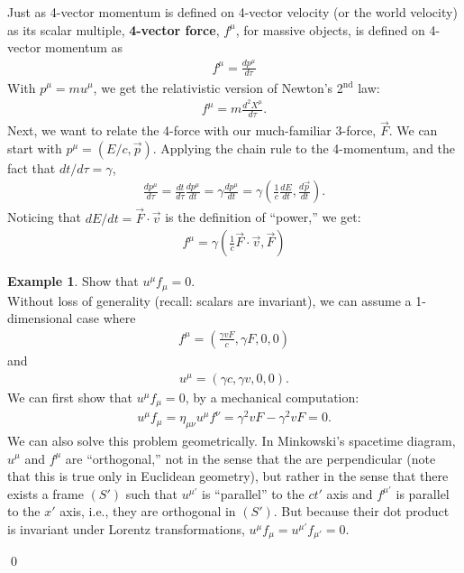 \documentclass{book}
\theoremstyle{definition}
\newtheorem{exmp}{Example}[section]
\begin{document}
Just as 4-vector momentum is defined on 4-vector velocity (or the world velocity) as its scalar multiple, \textbf{4-vector force}, $f^\mu$, for massive objects, is defined on 4-vector momentum as
\begin{align*}
\boxed{f^\mu = \frac{dp^\mu}{d\tau}}
\end{align*}
With $p^\mu = mu^\mu$, we get the relativistic version of Newton's 2$^\text{nd}$ law:
\begin{align*}
f^\mu = m\frac{d^2X^\mu}{d\tau}.
\end{align*}
Next, we want to relate the 4-force with our much-familiar 3-force, $\vec{F}$. We can start with $p^\mu = (E/c, \vec{p})$. Applying the chain rule to the 4-momentum, and the fact that $dt/d\tau = \gamma$,
\begin{align*}
\frac{dp^\mu}{d\tau} = \frac{dt}{d\tau}\frac{dp^\mu}{dt} = \gamma\frac{dp^\mu}{dt} = \gamma\left( \frac{1}{c}\frac{dE}{dt},\frac{d\vec{p}}{dt} \right).
\end{align*}
Noticing that $dE/dt = \vec{F}\cdot\vec{v}$ is the definition of ``power,'' we get:
\begin{align*}
\boxed{f^\mu = \gamma\left( \frac{1}{c}\vec{F}\cdot\vec{v}, \vec{F} \right)} 
\end{align*}
\begin{exmp}
	Show that $u^\mu f_\mu = 0$.\\
	
	Without loss of generality (recall: scalars are invariant), we can assume a 1-dimensional case where
	\begin{align*}
	f^\mu = \left( \frac{\gamma v F}{c}, \gamma F, 0,0\right) 
	\end{align*}
	and
	\begin{align*}
	u^\mu = \left( \gamma c, \gamma v,0,0 \right). 
	\end{align*}
	We can first show that $u^\mu f_\mu = 0$, by a mechanical computation:
	\begin{align*}
	u^\mu f_\mu = \eta_{\mu\nu}u^\mu f^\nu = \gamma^2vF - \gamma^2 vF = 0.
	\end{align*}
	We can also solve this problem geometrically. In Minkowski's spacetime diagram, $u^\mu$ and $f^\mu$ are ``orthogonal,'' not in the sense that the are perpendicular (note that this is true only in Euclidean geometry), but rather in the sense that there exists a frame $(S')$ such that $u^{\mu'}$ is ``parallel'' to the $ct'$ axis and $f^{\mu'}$ is parallel to the $x'$ axis, i.e., they are orthogonal in $(S')$. But because their dot product is invariant under Lorentz transformations, $u^\mu f_\mu = u^{\mu'}f_{\mu'} = 0$. 

\end{exmp}\qed
\end{document}
